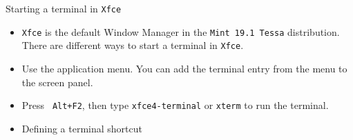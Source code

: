 \begin{frame}{Starting a terminal in \texttt{Xfce}}
    \begin{itemize}
  \item {\small \texttt{Xfce} is the default \alert{Window Manager} in the \texttt{Mint 19.1 Tessa} distribution.  There are different ways to start a terminal in \texttt{Xfce}. }

  \item {\small Use the application menu. You can add the terminal entry from the menu to the screen panel.}
  \item {\small Press \texttt{ Alt+F2}, then type \texttt{xfce4-terminal} or \texttt{xterm} to run the terminal.

}

  \item {\small Defining a terminal shortcut}
  \end{itemize}
\end{frame}
